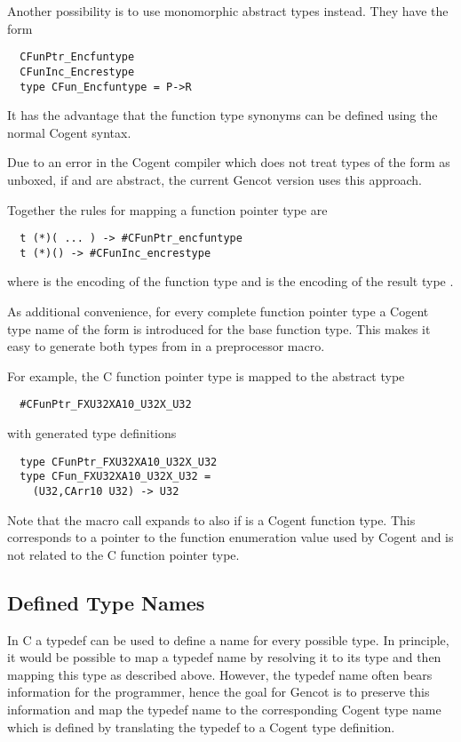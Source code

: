 Another possibility is to use monomorphic abstract types instead. They have the form
\begin{verbatim}
  CFunPtr_Encfuntype
  CFunInc_Encrestype
  type CFun_Encfuntype = P->R
\end{verbatim}
It has the advantage that the function type synonyms can be defined using the normal Cogent syntax.

Due to an error in the Cogent compiler which does not treat types of the form  as unboxed, if 
and  are abstract, the current Gencot version uses this approach.

Together the rules for mapping a function pointer type are
\begin{verbatim}
  t (*)( ... ) -> #CFunPtr_encfuntype
  t (*)() -> #CFunInc_encrestype
\end{verbatim}
where  is the encoding of the function type  
and  is the encoding of the result type .

As additional convenience, for every complete function pointer type a Cogent type name of the form 
is introduced for the base function type. This makes it easy to generate both types from  in a preprocessor
macro.

For example, the C function pointer type  is mapped to the abstract type
\begin{verbatim}
  #CFunPtr_FXU32XA10_U32X_U32
\end{verbatim}
with generated type definitions
\begin{verbatim}
  type CFunPtr_FXU32XA10_U32X_U32
  type CFun_FXU32XA10_U32X_U32 =
    (U32,CArr10 U32) -> U32
\end{verbatim}

Note that the macro call  expands to  also if  is a Cogent function type.
This corresponds to a pointer to the function enumeration value used by Cogent and is not related to the C
function pointer type.

\subsection{Defined Type Names}
\label{design-types-typedef}

In C a typedef can be used to define a name for every possible type. In principle, it would be possible to
map a typedef name by resolving it to its type and then mapping this type as described above. However, the
typedef name often bears information for the programmer, hence the goal for Gencot is to preserve this information
and map the typedef name to the corresponding Cogent type name which is defined by translating the typedef
to a Cogent type definition.

